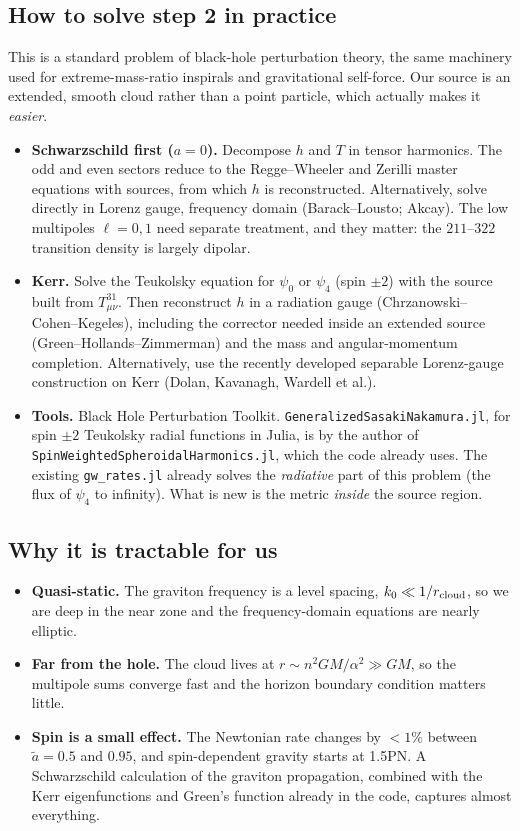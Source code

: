 \documentclass[11pt]{article}
\begin{document}
\subsection{How to solve step 2 in practice}
This is a standard problem of black-hole perturbation theory, the same machinery used for extreme-mass-ratio inspirals and gravitational self-force. Our source is an extended, smooth cloud rather than a point particle, which actually makes it \emph{easier}.
\begin{itemize}[leftmargin=1.4em]
\item \textbf{Schwarzschild first ($a=0$).} Decompose $h$ and $T$ in tensor harmonics. The odd and even sectors reduce to the Regge--Wheeler and Zerilli master equations with sources, from which $h$ is reconstructed. Alternatively, solve directly in Lorenz gauge, frequency domain (Barack--Lousto; Akcay). The low multipoles $\ell=0,1$ need separate treatment, and they matter: the $211$--$322$ transition density is largely dipolar.
\item \textbf{Kerr.} Solve the Teukolsky equation for $\psi_0$ or $\psi_4$ (spin $\pm2$) with the source built from $T^{31}_{\mu\nu}$. Then reconstruct $h$ in a radiation gauge (Chrzanowski--Cohen--Kegeles), including the corrector needed inside an extended source (Green--Hollands--Zimmerman) and the mass and angular-momentum completion. Alternatively, use the recently developed separable Lorenz-gauge construction on Kerr (Dolan, Kavanagh, Wardell et al.).
\item \textbf{Tools.} Black Hole Perturbation Toolkit. \texttt{GeneralizedSasakiNakamura.jl}, for spin $\pm2$ Teukolsky radial functions in Julia, is by the author of \texttt{SpinWeightedSpheroidalHarmonics.jl}, which the code already uses. The existing \texttt{gw\_rates.jl} already solves the \emph{radiative} part of this problem (the flux of $\psi_4$ to infinity). What is new is the metric \emph{inside} the source region.
\end{itemize}

\subsection{Why it is tractable for us}
\begin{itemize}[leftmargin=1.4em]
\item \textbf{Quasi-static.} The graviton frequency is a level spacing, $k_0\ll1/r_{\rm cloud}$, so we are deep in the near zone and the frequency-domain equations are nearly elliptic.
\item \textbf{Far from the hole.} The cloud lives at $r\sim n^2GM/\alpha^2\gg GM$, so the multipole sums converge fast and the horizon boundary condition matters little.
\item \textbf{Spin is a small effect.} The Newtonian rate changes by $<1\%$ between $\tilde a=0.5$ and $0.95$, and spin-dependent gravity starts at 1.5PN. A Schwarzschild calculation of the graviton propagation, combined with the Kerr eigenfunctions and Green's function already in the code, captures almost everything.
\end{itemize}
\end{document}
